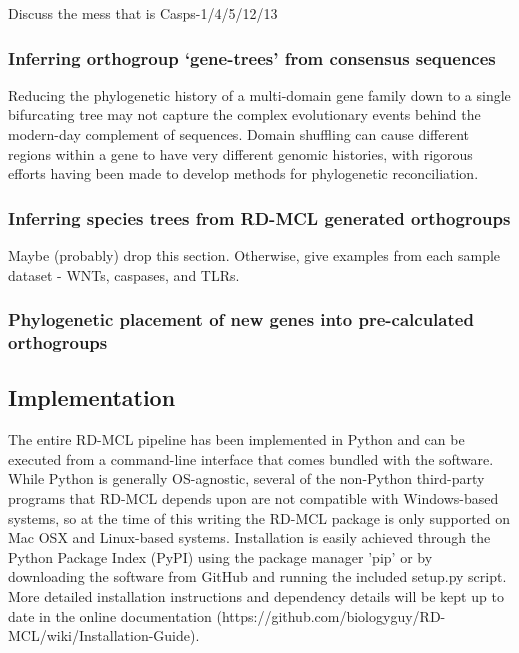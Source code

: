 \documentclass[twocolumn]{bmcart}  %
\begin{document}
Discuss the mess that is Casps-1/4/5/12/13


\subsubsection{Inferring orthogroup `gene-trees' from consensus sequences}
Reducing the phylogenetic history of a multi-domain gene family down to a single bifurcating tree may not capture the complex evolutionary events behind the modern-day complement of sequences.
Domain shuffling can cause different regions within a gene to have very different genomic histories, with rigorous efforts having been made to develop methods for phylogenetic reconciliation.

\subsubsection{Inferring species trees from RD-MCL generated orthogroups}
Maybe (probably) drop this section.
Otherwise, give examples from each sample dataset - WNTs, caspases, and TLRs.


\subsubsection{Phylogenetic placement of new genes into pre-calculated orthogroups}


\subsection{Implementation}\label{subsec:implementation}
The entire RD-MCL pipeline has been implemented in Python and can be executed from a command-line interface that comes bundled with the software.
While Python is generally OS-agnostic, several of the non-Python third-party programs that RD-MCL depends upon are not compatible with Windows-based systems, so at the time of this writing the RD-MCL package is only supported on Mac OSX and Linux-based systems.
Installation is easily achieved through the Python Package Index (PyPI) using the package manager 'pip' or by downloading the software from GitHub and running the included setup.py script.
More detailed installation instructions and dependency details will be kept up to date in the online documentation (https://github.com/biologyguy/RD-MCL/wiki/Installation-Guide).
\end{document}
